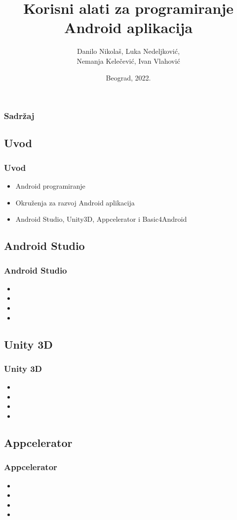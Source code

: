 \documentclass{beamer}
\title{Korisni alati za programiranje Android aplikacija}
\author{Danilo Nikolaš, Luka Nedeljković,\\ Nemanja Kelečević, Ivan Vlahović}
\institute[]{Matematički fakultet, Univerzitet u Beogradu}
\date{
	\footnotesize{Beograd, 2022.}	
}
\begin{document}
\begin{frame}
	\titlepage
\end{frame}


\begin{frame}
	\frametitle{Sadržaj}
	\tableofcontents[hidesubsections] 
\end{frame}

\begin{frame}
    \section{Uvod}
    \frametitle{Uvod} 
    \begin{itemize}
	\item Android programiranje
	\item Okruženja za razvoj Android aplikacija
	\item Android Studio, Unity3D, Appcelerator i Basic4Android
   \end{itemize}
\end{frame}

\begin{frame}
    \section{Android Studio}
    \frametitle{Android Studio} 
    \begin{itemize}
	\item
	\item 
	\item 
	\item  
   \end{itemize}
\end{frame}

\begin{frame}
    \section{Unity 3D}
    \frametitle{Unity 3D} 
    \begin{itemize}
	\item
	\item 
	\item 
	\item  
   \end{itemize}
\end{frame}

\begin{frame}
    \section{Appcelerator}
    \frametitle{Appcelerator} 
    \begin{itemize}
	\item
	\item 
	\item 
	\item  
   \end{itemize}
\end{frame}
\end{document}
